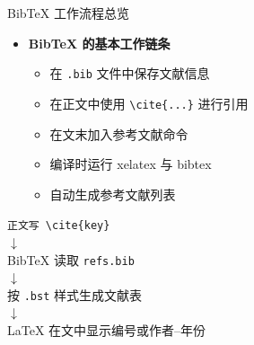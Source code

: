 \documentclass[aspectratio=169,UTF8,11pt]{ctexbeamer}
\begin{document}
\begin{frame}[fragile]{BibTeX 工作流程总览}

\begin{itemize}
  \item \textbf{BibTeX 的基本工作链条}
  \begin{itemize}
    \item 在 \texttt{.bib} 文件中保存文献信息
    \item 在正文中使用 \verb|\cite{...}| 进行引用
    \item 在文末加入参考文献命令
    \item 编译时运行 xelatex 与 bibtex
    \item 自动生成参考文献列表
  \end{itemize}
\end{itemize}

\vspace{0.8em}

\begin{center}
\texttt{正文写 \textbackslash cite\{key\}}\\[0.4em]
$\downarrow$\\[0.4em]
BibTeX 读取 \texttt{refs.bib}\\[0.4em]
$\downarrow$\\[0.4em]
按 \texttt{.bst} 样式生成文献表\\[0.4em]
$\downarrow$\\[0.4em]
LaTeX 在文中显示编号或作者--年份
\end{center}

\end{frame}
\end{document}
